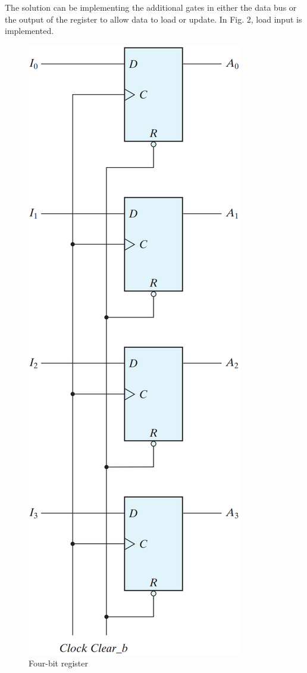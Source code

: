 The solution can be implementing the additional gates in either the data bus or the output of the register to allow data to load or update. In Fig. 2, load input is implemented.

\vspace*{\fill}
\columnbreak

\begin{figure}[H]
  \centering
  \includegraphics[width=.9\linewidth]{img/fig-6.1.png}
  \caption{Four-bit register}
  \label{fig:6.1}
\end{figure}

